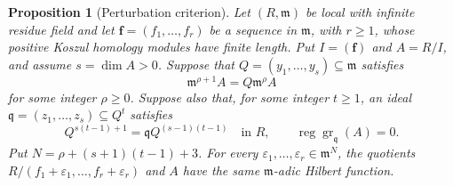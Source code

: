 \documentclass[11pt,reqno]{amsart}
\numberwithin{equation}{section}
\newtheorem{proposition}[theorem]{Proposition}
\theoremstyle{definition}
\newcommand{\f}{\mathbf f}
\begin{document}
\begin{proposition}[Perturbation criterion]
\label{thm:tr-criterion}
Let $(R,\mathfrak m)$ be local with infinite residue field and let
$\f=(f_1,\ldots,f_r)$ be a sequence in $\mathfrak m$, with $r\ge1$,
whose positive Koszul homology modules have finite length. Put
$I=(\f)$ and $A=R/I$, and assume $s=\dim A>0$.
Suppose that $Q=(y_1,\ldots,y_s)\subseteq\mathfrak m$ satisfies
\[
 \mathfrak m^{\rho+1}A=Q\mathfrak m^\rho A
\]
for some integer $\rho\geq0$. Suppose also that, for some integer $t\geq1$, an ideal
$\mathfrak q=(z_1,\ldots,z_s)\subseteq Q^t$ satisfies
\[
 Q^{s(t-1)+1}=\mathfrak qQ^{(s-1)(t-1)}
 \quad\text{in }R,
 \qquad
 \operatorname{reg}\operatorname{gr}_{\mathfrak q}(A)=0.
\]
Put $N=\rho+(s+1)(t-1)+3$. For every
$\varepsilon_1,\ldots,\varepsilon_r\in\mathfrak m^N$, the quotients
$R/(f_1+\varepsilon_1,\ldots,f_r+\varepsilon_r)$ and $A$
have the same $\mathfrak m$-adic Hilbert function.
\end{proposition}
\end{document}
